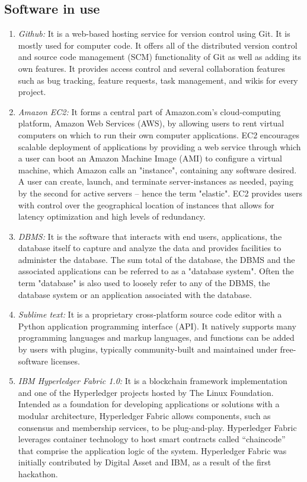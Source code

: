 \documentclass[conference]{IEEEtran}
\begin{document}
\subsection{Software in use}
\begin{enumerate} [font=\itshape]
  \item \textit{Github: } It is a web-based hosting service for version control using Git. It is mostly used for computer code. It offers all of the distributed version control and source code management (SCM) functionality of Git as well as adding its own features. It provides access control and several collaboration features such as bug tracking, feature requests, task management, and wikis for every project.\\
   \item \textit{Amazon EC2: } It forms a central part of Amazon.com's cloud-computing platform, Amazon Web Services (AWS), by allowing users to rent virtual computers on which to run their own computer applications. EC2 encourages scalable deployment of applications by providing a web service through which a user can boot an Amazon Machine Image (AMI) to configure a virtual machine, which Amazon calls an "instance", containing any software desired. A user can create, launch, and terminate server-instances as needed, paying by the second for active servers – hence the term "elastic". EC2 provides users with control over the geographical location of instances that allows for latency optimization and high levels of redundancy. \\
   \item \textit{DBMS: }It is the software that interacts with end users, applications, the database itself to capture and analyze the data and provides facilities to administer the database. The sum total of the database, the DBMS and the associated applications can be referred to as a "database system". Often the term "database" is also used to loosely refer to any of the DBMS, the database system or an application associated with the database.\\
   \item \textit{Sublime text: } It is a proprietary cross-platform source code editor with a Python application programming interface (API). It natively supports many programming languages and markup languages, and functions can be added by users with plugins, typically community-built and maintained under free-software licenses.\\
   \item \textit{IBM Hyperledger Fabric 1.0: }It is a blockchain framework implementation and one of the Hyperledger projects hosted by The Linux Foundation. Intended as a foundation for developing applications or solutions with a modular architecture, Hyperledger Fabric allows components, such as consensus and membership services, to be plug-and-play. Hyperledger Fabric leverages container technology to host smart contracts called “chaincode” that comprise the application logic of the system. Hyperledger Fabric was initially contributed by Digital Asset and IBM, as a result of the first hackathon.
\end{enumerate}
\end{document}
